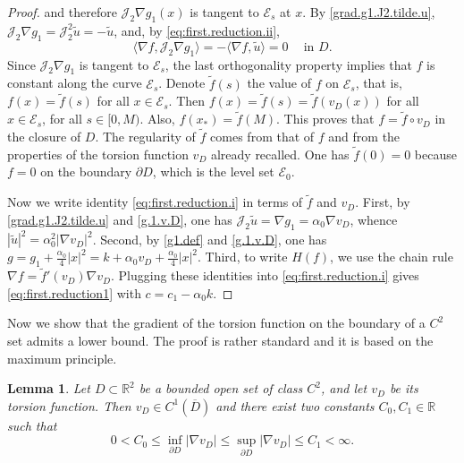 \documentclass[10pt,reqno,a4paper]{article}
\numberwithin{equation}{section}
\theoremstyle{plain}
\newtheorem{lemma}[theorem]{Lemma}
\theoremstyle{definition}
\newcommand{\R}{{\mathbb R}}
\newcommand{\mE}{\mathcal{E}}
\newcommand{\mJ}{\mathcal{J}}
\newcommand{\la}{\langle}
\newcommand{\ra}{\rangle}
\newcommand{\pa}{\partial}
\newcommand{\grad}{\nabla}
\begin{document}
\begin{proof}
and therefore $\mJ_2 \grad g_1(x)$ is tangent to $\mE_s$ at $x$. 
By \eqref{grad.g1.J2.tilde.u}, $\mJ_2 \grad g_1 = \mJ_2^2 \tilde u = - \tilde u$, 
and, by \eqref{eq:first.reduction.ii},
\[
\la \grad f , \mJ_2 \grad g_1 \ra 
= - \la \grad f , \tilde u \ra 
= 0 
\quad \ \text{in } D.
\]
Since $\mJ_2 \grad g_1$ is tangent to $\mE_s$, 
the last orthogonality property implies that $f$ is constant along the curve $\mE_s$. 
Denote $\tilde f(s)$ the value of $f$ on $\mE_s$, that is, $f(x) = \tilde f(s)$ for all $x \in \mE_s$. 
Then $f(x) = \tilde f(s) = \tilde f(v_D(x))$ for all $x \in \mE_s$, for all $s \in [0,M)$.  
Also, $f(x_*) = \tilde f(M)$. 
This proves that $f = \tilde f \circ v_D$ in the closure of $D$. 
The regularity of $\tilde f$ comes from that of $f$ 
and from the properties of the torsion function $v_D$ already recalled. 
One has $\tilde f(0) = 0$ because $f=0$ on the boundary $\pa D$, 
which is the level set $\mE_0$.  


Now we write identity \eqref{eq:first.reduction.i} in terms of $\tilde f$ and $v_D$. 
First, by \eqref{grad.g1.J2.tilde.u} and \eqref{g.1.v.D}, one has 
$\mJ_2 \tilde u = \nabla g_1 = \alpha_0 \grad v_D$, whence 
$|\tilde u|^2 = \alpha_0^2 |\grad v_D|^2$. 
Second, by \eqref{g1.def} and \eqref{g.1.v.D}, one has 
$g = g_1 + \frac{\alpha_0}{4} |x|^2 
= k + \alpha_0 v_D + \frac{\alpha_0}{4} |x|^2$. 
Third, to write $H(f)$, we use the chain rule $\grad f = \tilde f'(v_D) \grad v_D$. 
Plugging these identities into \eqref{eq:first.reduction.i} gives \eqref{eq:first.reduction1}
with $c = c_1 - \alpha_0 k$.
\end{proof}



Now we show that the gradient of the torsion function 
on the boundary of a $C^2$ set
admits a lower bound. %
The proof is rather standard and it is based on the maximum principle.

\begin{lemma}\label{lem:lower.bound}
Let $D\subset \R^2$ be a bounded open set of class $C^{2}$, 
and let $v_D$ be its torsion function.
Then $v_D\in C^1(\overline D)$ and there exist two constants $C_0, C_1 \in \R$ such that 
\[
0 < C_0 \leq \inf_{\pa D} |\nabla v_D| 
\leq \sup_{\pa D} |\grad v_D| \leq C_1 < \infty. 
\]
\end{lemma}
\end{document}
